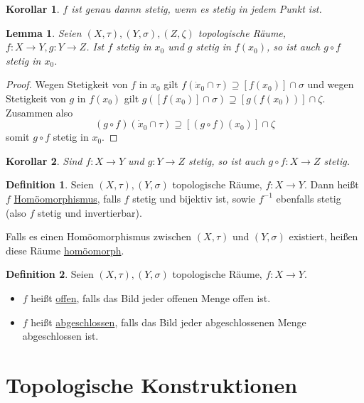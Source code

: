 \documentclass[12pt]{scrartcl}%
\newtheorem{korollar}{Korollar}
\newtheorem{lemma}{Lemma}
\theoremstyle{definition}
\newtheorem*{defn}{Definition}
\theoremstyle{remark}
\newcommand\Inv[1]{#1^{-1}}
\begin{document}
\begin{korollar}
    $f$ ist genau dannn stetig, wenn es stetig in jedem Punkt ist.
\end{korollar}

\begin{lemma}
    Seien $(X,\tau),(Y,\sigma),(Z,\zeta)$ topologische Räume, $f:X\to Y, g:Y\to Z$. Ist $f$ stetig in $x_0$ und $g$ stetig in $f(x_0)$, so ist auch $g\circ f$ stetig in $x_0$.
\end{lemma}

\begin{proof}
    Wegen Stetigkeit von $f$ in $x_0$ gilt $f(\dot x_0 \cap \tau) \supseteq [f(x_0)] \cap \sigma$ und wegen Stetigkeit von $g$ in $f(x_0)$ gilt $g([f(x_0)] \cap \sigma) \supseteq [g(f(x_0))] \cap \zeta$. Zusammen also $$(g\circ f)(\dot x_0 \cap \tau) \supseteq [(g\circ f)(x_0)] \cap \zeta$$ somit $g\circ f$ stetig in $x_0$.
\end{proof}

\begin{korollar}
    Sind $f:X\to Y$ und $g:Y\to Z$ stetig, so ist auch $g\circ f:X\to Z$ stetig.
\end{korollar}

\begin{defn}
    Seien $(X,\tau),(Y,\sigma)$ topologische Räume, $f:X\to Y$. Dann heißt $f$ \underline{Homöomorphismus}, falls $f$ stetig und bijektiv ist, sowie $\Inv f$ ebenfalls stetig (also $f$ stetig und invertierbar).

    Falls es einen Homöomorphismus zwischen $(X,\tau)$ und $(Y,\sigma)$ existiert, heißen diese Räume \underline{homöomorph}.
\end{defn}

\begin{defn}
    Seien $(X,\tau),(Y,\sigma)$ topologische Räume, $f:X\to Y$.

    \begin{itemize}
        \item $f$ heißt \underline{offen}, falls das Bild jeder offenen Menge offen ist.
        \item $f$ heißt \underline{abgeschlossen}, falls das Bild jeder abgeschlossenen Menge abgeschlossen ist.
    \end{itemize}
\end{defn}

\section*{Topologische Konstruktionen}
\end{document}
